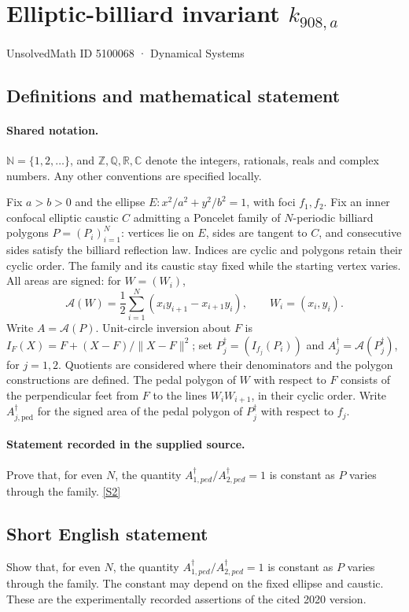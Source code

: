 \documentclass[11pt]{article}
\newcommand{\sref}[2]{\hyperlink{source:#1:#2}{[S#2]}}
\begin{document}
\setcounter{section}{5100067}
\section{Elliptic-billiard invariant $k_{908,a}$}\label{5100068}
{\small\sffamily UnsolvedMath ID 5100068 · Dynamical Systems}
\subsection{Definitions and mathematical statement}

\paragraph{Shared notation.}$\mathbb N=\{1,2,\ldots\}$, and $\mathbb Z,\mathbb Q,\mathbb R,\mathbb C$ denote the integers, rationals, reals and complex numbers. Any other conventions are specified locally.


Fix $a>b>0$ and the ellipse $E:x^2/a^2+y^2/b^2=1$, with foci $f_1,f_2$. Fix an inner confocal elliptic caustic $C$ admitting a Poncelet family of $N$-periodic billiard polygons $P=(P_i)_{i=1}^N$: vertices lie on $E$, sides are tangent to $C$, and consecutive sides satisfy the billiard reflection law. Indices are cyclic and polygons retain their cyclic order. The family and its caustic stay fixed while the starting vertex varies. All areas are signed: for $W=(W_i)$,
\[\mathcal A(W)=\frac12\sum_{i=1}^N(x_i y_{i+1}-x_{i+1}y_i),\qquad W_i=(x_i,y_i).\]
Write $A=\mathcal A(P)$. Unit-circle inversion about $F$ is $I_F(X)=F+(X-F)/\lVert X-F\rVert^2$; set $P_j^\dagger=(I_{f_j}(P_i))$ and $A_j^\dagger=\mathcal A(P_j^\dagger)$, for $j=1,2$. Quotients are considered where their denominators and the polygon constructions are defined. The pedal polygon of $W$ with respect to $F$ consists of the perpendicular feet from $F$ to the lines $W_iW_{i+1}$, in their cyclic order. Write $A_{j,\mathrm{ped}}^\dagger$ for the signed area of the pedal polygon of $P_j^\dagger$ with respect to $f_j$.
\paragraph{Statement recorded in the supplied source.}
Prove that, for even $N$, the quantity $A_{1,ped}^\dagger/A_{2,ped}^\dagger=1$ is constant as $P$ varies through the family. \sref{5100068}{2}
\subsection{Short English statement}
Show that, for even $N$, the quantity $A_{1,ped}^\dagger/A_{2,ped}^\dagger=1$ is constant as $P$ varies through the family. The constant may depend on the fixed ellipse and caustic. These are the experimentally recorded assertions of the cited 2020 version.
\end{document}

